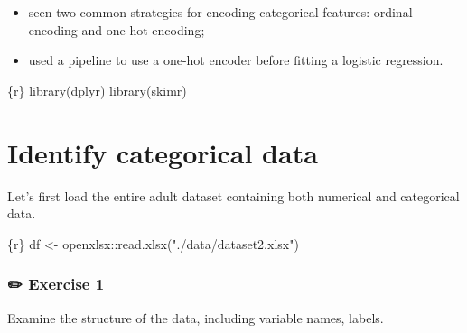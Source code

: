 \documentclass[
  letterpaper,
  DIV=11,
  numbers=noendperiod,
  oneside]{scrreprt}
\newenvironment{Shaded}{\begin{snugshade}}{\end{snugshade}}
\newcommand{\FunctionTok}[1]{\textcolor[rgb]{0.28,0.35,0.67}{#1}}
\newcommand{\InformationTok}[1]{\textcolor[rgb]{0.37,0.37,0.37}{#1}}
\newcommand{\NormalTok}[1]{\textcolor[rgb]{0.00,0.23,0.31}{#1}}
\newcommand{\OtherTok}[1]{\textcolor[rgb]{0.00,0.23,0.31}{#1}}
\newcommand{\SpecialCharTok}[1]{\textcolor[rgb]{0.37,0.37,0.37}{#1}}
\newcommand{\StringTok}[1]{\textcolor[rgb]{0.13,0.47,0.30}{#1}}
\providecommand{\tightlist}{%
  \setlength{\itemsep}{0pt}\setlength{\parskip}{0pt}}\usepackage{longtable,booktabs,array}
\begin{document}
\begin{itemize}
\tightlist
\item
  seen two common strategies for encoding categorical features: ordinal
  encoding and one-hot encoding;
\item
  used a pipeline to use a one-hot encoder before fitting a logistic
  regression.
\end{itemize}

\begin{Shaded}
\begin{Highlighting}[]
\InformationTok{\textasciigrave{}\textasciigrave{}\textasciigrave{}\{r\}}
\FunctionTok{library}\NormalTok{(dplyr)}
\FunctionTok{library}\NormalTok{(skimr)}
\InformationTok{\textasciigrave{}\textasciigrave{}\textasciigrave{}}
\end{Highlighting}
\end{Shaded}

\hypertarget{identify-categorical-data}{%
\section{Identify categorical data}\label{identify-categorical-data}}

Let's first load the entire adult dataset containing both numerical and
categorical data.

\begin{Shaded}
\begin{Highlighting}[]
\InformationTok{\textasciigrave{}\textasciigrave{}\textasciigrave{}\{r\}}
\NormalTok{df }\OtherTok{\textless{}{-}}\NormalTok{ openxlsx}\SpecialCharTok{::}\FunctionTok{read.xlsx}\NormalTok{(}\StringTok{"./data/dataset2.xlsx"}\NormalTok{)}
\InformationTok{\textasciigrave{}\textasciigrave{}\textasciigrave{}}
\end{Highlighting}
\end{Shaded}

\hypertarget{exercise-1-6}{%
\subsubsection{\texorpdfstring{{✏️} Exercise
1}{✏️ Exercise 1}}\label{exercise-1-6}}

Examine the structure of the data, including variable names, labels.
\end{document}
